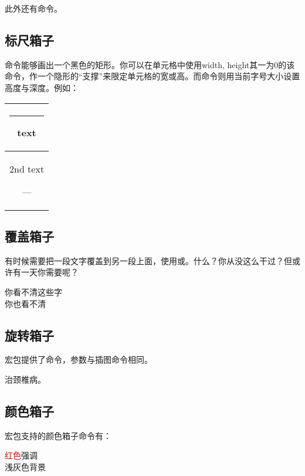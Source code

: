 此外还有命令。

\subsection{标尺箱子}
命令能够画出一个黑色的矩形。你可以在单元格中使用width, height其一为0的该命令，作一个隐形的“支撑”来限定单元格的宽或高。而命令则用当前字号大小设置高度与深度。例如：

\begin{codeshow}
\begin{tabular}{|c|}
  \hline
  \rule[-1em]{1em}{1ex}text
  \rule{0pt}{38pt} \\
  \hline
  2nd text\strut--- \\
  \hline
\end{tabular}
\end{codeshow}

\subsection{覆盖箱子}
有时候需要把一段文字覆盖到另一段上面，使用或。什么？你从没这么干过？但或许有一天你需要呢？

\begin{codeshow}
你看不清这些字\\
你也看不清
\end{codeshow}

\subsection{旋转箱子}
宏包提供了命令，参数与插图命令相同。
\begin{codeshow}
治颈椎病。
\end{codeshow}

\subsection{颜色箱子}
\label{subsec:colorbox}
宏包支持的颜色箱子命令有：

\begin{codeshow}
\textcolor{red}{红色}强调\\
\colorbox[gray]{0.95}{浅灰色背景} \\
\end{codeshow}

